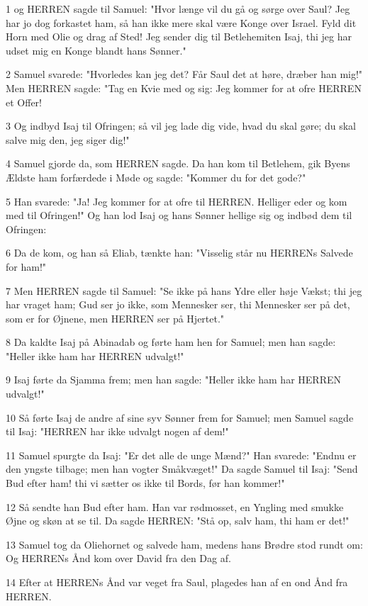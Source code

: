 \par 1 og HERREN sagde til Samuel: "Hvor længe vil du gå og sørge over Saul? Jeg har jo dog forkastet ham, så han ikke mere skal være Konge over Israel. Fyld dit Horn med Olie og drag af Sted! Jeg sender dig til Betlehemiten Isaj, thi jeg har udset mig en Konge blandt hans Sønner."
\par 2 Samuel svarede: "Hvorledes kan jeg det? Får Saul det at høre, dræber han mig!" Men HERREN sagde: "Tag en Kvie med og sig: Jeg kommer for at ofre HERREN et Offer!
\par 3 Og indbyd Isaj til Ofringen; så vil jeg lade dig vide, hvad du skal gøre; du skal salve mig den, jeg siger dig!"
\par 4 Samuel gjorde da, som HERREN sagde. Da han kom til Betlehem, gik Byens Ældste ham forfærdede i Møde og sagde: "Kommer du for det gode?"
\par 5 Han svarede: "Ja! Jeg kommer for at ofre til HERREN. Helliger eder og kom med til Ofringen!" Og han lod Isaj og hans Sønner hellige sig og indbød dem til Ofringen:
\par 6 Da de kom, og han så Eliab, tænkte han: "Visselig står nu HERRENs Salvede for ham!"
\par 7 Men HERREN sagde til Samuel: "Se ikke på hans Ydre eller høje Vækst; thi jeg har vraget ham; Gud ser jo ikke, som Mennesker ser, thi Mennesker ser på det, som er for Øjnene, men HERREN ser på Hjertet."
\par 8 Da kaldte Isaj på Abinadab og førte ham hen for Samuel; men han sagde: "Heller ikke ham har HERREN udvalgt!"
\par 9 Isaj førte da Sjamma frem; men han sagde: "Heller ikke ham har HERREN udvalgt!"
\par 10 Så førte Isaj de andre af sine syv Sønner frem for Samuel; men Samuel sagde til Isaj: "HERREN har ikke udvalgt nogen af dem!"
\par 11 Samuel spurgte da Isaj: "Er det alle de unge Mænd?" Han svarede: "Endnu er den yngste tilbage; men han vogter Småkvæget!" Da sagde Samuel til Isaj: "Send Bud efter ham! thi vi sætter os ikke til Bords, før han kommer!"
\par 12 Så sendte han Bud efter ham. Han var rødmosset, en Yngling med smukke Øjne og skøn at se til. Da sagde HERREN: "Stå op, salv ham, thi ham er det!"
\par 13 Samuel tog da Oliehornet og salvede ham, medens hans Brødre stod rundt om: Og HERRENs Ånd kom over David fra den Dag af.
\par 14 Efter at HERRENs Ånd var veget fra Saul, plagedes han af en ond Ånd fra HERREN.
